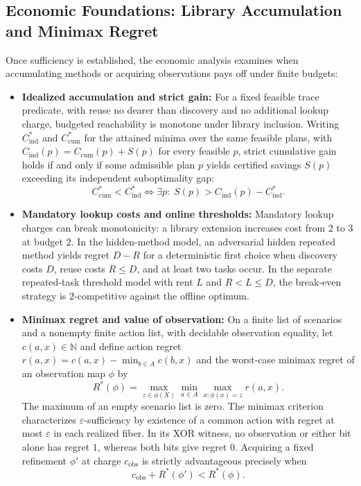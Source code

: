 \documentclass[10pt,letterpaper]{article}
\begin{document}
\subsection{Economic Foundations: Library Accumulation and Minimax Regret}
Once sufficiency is established, the economic analysis examines when accumulating methods or acquiring observations pays off under finite budgets:
\begin{itemize}
    \item \textbf{Idealized accumulation and strict gain:} For a fixed feasible trace predicate, with reuse no dearer than discovery and no additional lookup charge, budgeted reachability is monotone under library inclusion. Writing $C_{\mathrm{ind}}^*$ and $C_{\mathrm{cum}}^*$ for the attained minima over the same feasible plans, with $C_{\mathrm{ind}}(p)=C_{\mathrm{cum}}(p)+S(p)$ for every feasible $p$, strict cumulative gain holds if and only if some admissible plan $p$ yields certified savings $S(p)$ exceeding its independent suboptimality gap:
    \begin{equation}
    \label{eq:t15}
    C_{\mathrm{cum}}^* < C_{\mathrm{ind}}^* \iff \exists p :\; S(p) > C_{\mathrm{ind}}(p) - C_{\mathrm{ind}}^*.
    \end{equation}
    \item \textbf{Mandatory lookup costs and online thresholds:} Mandatory lookup charges can break monotonicity: a library extension increases cost from $2$ to $3$ at budget $2$. In the hidden-method model, an adversarial hidden repeated method yields regret $D-R$ for a deterministic first choice when discovery costs $D$, reuse costs $R\le D$, and at least two tasks occur. In the separate repeated-task threshold model with rent $L$ and $R<L\le D$, the break-even strategy is $2$-competitive against the offline optimum.
    \item \textbf{Minimax regret and value of observation:} On a finite list of scenarios and a nonempty finite action list, with decidable observation equality, let $c(a,x)\in\mathbb N$ and define action regret $r(a,x) = c(a,x) - \min_{b \in A} c(b,x)$ and the worst-case minimax regret of an observation map $\phi$ by
    \begin{equation}
    \label{eq:t18-regret}
    R^*(\phi) = \max_{z \in \phi(X)} \min_{a \in A} \max_{x : \phi(x)=z} r(a,x).
    \end{equation}
    The maximum of an empty scenario list is zero. The minimax criterion characterizes $\varepsilon$-sufficiency by existence of a common action with regret at most $\varepsilon$ in each realized fiber. In its XOR witness, no observation or either bit alone has regret $1$, whereas both bits give regret $0$. Acquiring a fixed refinement $\phi'$ at charge $c_{\mathrm{obs}}$ is strictly advantageous precisely when
    \begin{equation}
    \label{eq:t18-acq}
    c_{\mathrm{obs}} + R^*(\phi') < R^*(\phi).
    \end{equation}
\end{itemize}
\end{document}
